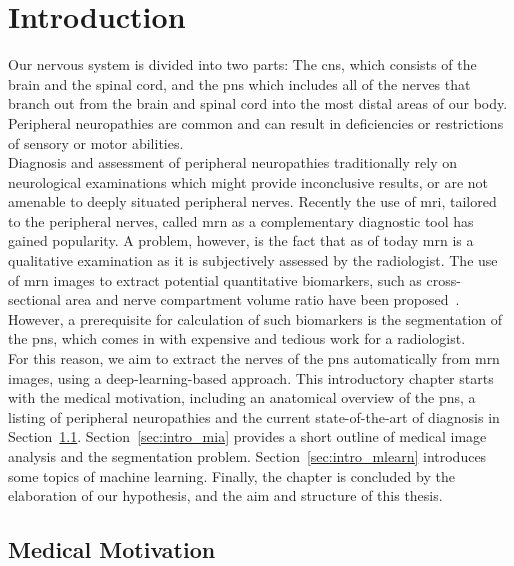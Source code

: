\chapter{Introduction} %
Our nervous system is divided into two parts: The \gls{cns}, which consists of the brain and the spinal cord, and the \gls{pns} which includes all of the nerves that branch out from the brain and spinal cord into the most distal areas of our body. Peripheral neuropathies are common and can result in deficiencies or restrictions of sensory or motor abilities.\\
Diagnosis and assessment of peripheral neuropathies traditionally rely on neurological examinations which might provide inconclusive results, or are not amenable to deeply situated peripheral nerves. Recently the use of \gls{mri}, tailored to the peripheral nerves, called \gls{mrn} as a complementary diagnostic tool has gained popularity. A problem, however, is the fact that as of today \gls{mrn} is a qualitative examination as it is subjectively assessed by the radiologist. The use of \gls{mrn} images to extract potential quantitative biomarkers, such as cross-sectional area and nerve compartment volume ratio have been proposed~\cite{Kronlage2017,Felisaz2017MRNeuropathy.}. However, a prerequisite for calculation of such biomarkers is the segmentation of the \gls{pns}, which comes in with expensive and tedious work for a radiologist.\\
For this reason, we aim to extract the nerves of the \gls{pns} automatically from \gls{mrn} images, using a deep-learning-based approach. This introductory chapter starts with the medical motivation, including an anatomical overview of the \gls{pns}, a listing of peripheral neuropathies and the current state-of-the-art of diagnosis in Section~\ref{sec:intro_medical}. Section~\ref{sec:intro_mia} provides a short outline of medical image analysis and the segmentation problem. Section~\ref{sec:intro_mlearn} introduces some topics of machine learning. Finally, the chapter is concluded by the elaboration of our hypothesis, and the aim and structure of this thesis.

\section{Medical Motivation} \label{sec:intro_medical} %
